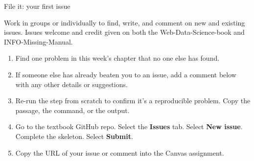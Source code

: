 \documentclass[9pt,aspectratio=169]{beamer}
\begin{document}

\begin{frame}{File it: your first issue}

            Work in groups or individually to find, write, and comment on new and existing issues. Issues welcome and credit given on both the Web-Data-Science-book and INFO-Missing-Manual.

            \medskip

            \begin{enumerate}
                \item Find one problem in this week's chapter that no one else has found.
                \item If someone else has already beaten you to an issue, add a comment below with any other details or suggestions.
                \item Re-run the step from scratch to confirm it's a reproducible problem. Copy the passage, the command, or the output.
                \item Go to the textbook GitHub repo. Select the \textbf{Issues} tab. Select \textbf{New issue}. Complete the skeleton. Select \textbf{Submit}.
                \item Copy the URL of your issue or comment into the Canvas assignment.
            \end{enumerate}
\end{frame}
\end{document}
